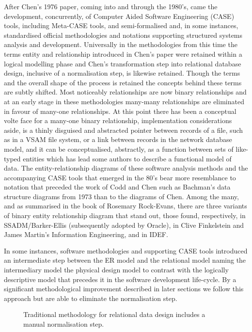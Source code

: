 After Chen's 1976 paper, coming into and through the 1980's, came the development, concurrently, of Computer Aided Software Engineering (CASE) tools, including Meta-CASE tools, and semi-formalised and, in some instances, standardised official methodologies and notations supporting structured systems analysis and development. Universally in the methodologies from this time the terms entity and relationship introduced in Chen's paper were retained within a logical modelling phase and Chen's transformation step into relational database design, inclusive of a normalisation step, is likewise retained. Though the terms and the overall shape of the process is retained the concepts behind these terms are subtly shifted. Most noticeably relationships are now binary relationships and at an early stage in these methodologies many-many relationships are eliminated in favour of many-one relationships. At this point there has been a conceptual volte face for a many-one binary relationship, implementation considerations aside, is a thinly disguised and abstracted pointer between records of a file, such as in a VSAM file system, or a link between records in the network database model, and it can be conceptualised, abstractly, as a function between sets of like-typed entities which has lead some authors to describe a functional model of data. The entity-relationship diagrams of these software analysis methods and the accompanying CASE tools that emerged in the 80's bear more resemblance to notation that preceded the work of Codd and Chen such as Bachman's data structure diagrams from 1973 than to the diagrams of Chen. Among the many,  and as summarised in the book of Rosemary Rock-Evans, there are three variants of binary entity relationship diagram that stand out, those found, respectively, in SSADM/Barker-Ellis (subsequently adopted by Oracle), in Clive Finkelstein and James Martin's Information Engineering, and in IDEF.

\mynote In some instances, software methodologies and supporting CASE tools introduced an intermediate step between the ER model and the relational model naming the intermediary model the physical design model to contrast with the logically descriptive model that precedes it in the software development life-cycle. By a significant methodological improvement described in later sections we follow this approach but are able to eliminate the normalisation step.
\begin{figure}[H]

\caption{Traditional methodology for relational data design includes a manual normalisation step.}
\end{figure}


